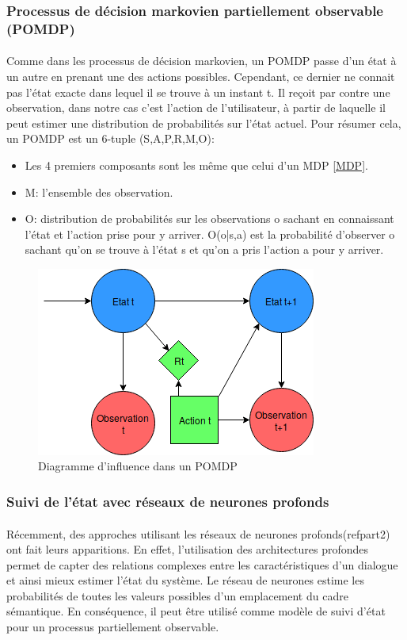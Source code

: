 \subsubsection{Processus de décision markovien partiellement observable (POMDP)}
\paragraph{}
Comme dans les processus de décision markovien, un POMDP\cite{Astrom1965} passe d’un état à un autre en prenant une des actions possibles. Cependant, ce dernier ne connait pas l’état exacte dans lequel il se trouve à un instant t. Il reçoit par contre une observation, dans notre cas c’est l’action de l’utilisateur, à partir de laquelle il peut estimer une distribution de probabilités sur l’état actuel. Pour résumer cela, un POMDP est un 6-tuple (S,A,P,R,M,O):
\begin{itemize}
\item Les 4 premiers composants sont les même que celui d’un MDP \ref{MDP}.
\item M: l’ensemble des observation.
\item O: distribution de probabilités sur les observations o sachant en connaissant l’état et l’action prise pour y arriver. O(o|s,a) est la probabilité d’observer o sachant qu’on se trouve à l’état s et qu’on a pris l’action a pour y arriver.
\end{itemize}

\begin{figure}[H]
	\centering
	\includegraphics[width=.5\linewidth]{images/DM/POMDP.png} 
	\caption{Diagramme d'influence dans un POMDP} 
\end{figure}

\subsubsection{Suivi de l’état avec réseaux de neurones profonds}
\paragraph{}
Récemment, des approches utilisant les réseaux de neurones profonds(refpart2) ont fait leurs apparitions. En effet, l'utilisation des architectures profondes permet de capter des relations complexes entre les caractéristiques d'un dialogue et ainsi mieux estimer l'état du système. Le réseau de neurones estime les probabilités de toutes les valeurs possibles d’un emplacement du cadre sémantique\cite{Henderson2013}. En conséquence, il peut être utilisé comme modèle de suivi d'état pour un processus partiellement observable.

